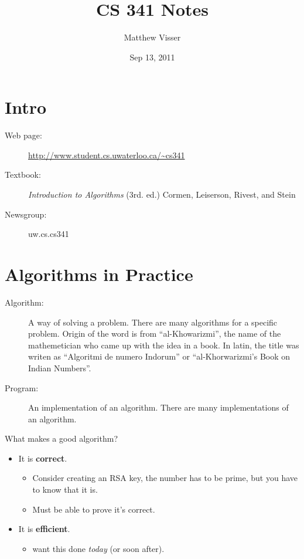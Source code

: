 \documentclass[12pt]{article}
\begin{document}
\title{CS 341 Notes}
\author{Matthew Visser}
\date{Sep 13, 2011}
\maketitle

\section*{Intro}

\begin{description}
    \item[Web page:] \url{http://www.student.cs.uwaterloo.ca/~cs341}
    \item[Textbook:] \textit{Introduction to Algorithms} (3rd. ed.) Cormen,
        Leiserson, Rivest, and Stein
    \item[Newsgroup:] uw.cs.cs341
\end{description}

\section*{Algorithms in Practice}

\begin{description}
    \item[Algorithm:] A way of solving a problem. There are many algorithms for
        a specific problem. Origin of the word is from ``al-Khowarizmi'', the
        name of the mathemetician who came up with the idea in a book. In latin,
        the title was writen as ``Algoritmi de numero Indorum'' or
        ``al-Khorwarizmi's Book on Indian Numbers''.
    \item[Program:] An implementation of an algorithm. There are many
        implementations of an algorithm.
\end{description}


What makes a good algorithm?

\begin{itemize}
    \item It is \textbf{correct}.
        \begin{itemize}
            \item Consider creating an RSA key, the number has to be prime, but
                you have to know that it is.
            \item Must be able to prove it's correct.
        \end{itemize}
    \item It is \textbf{efficient}.
        \begin{itemize}
            \item want this done \textit{today} (or soon after).
        \end{itemize}
\end{itemize}
\end{document}

